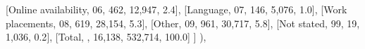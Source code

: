 \documentclass[
  11pt,
  a4paper,
]{article}
\newenvironment{Shaded}{\begin{snugshade}}{\end{snugshade}}
\newcommand{\NormalTok}[1]{\textcolor[rgb]{0.00,0.23,0.31}{#1}}
\newcommand{\StringTok}[1]{\textcolor[rgb]{0.13,0.47,0.30}{#1}}
\begin{document}
\begin{Shaded}
\begin{Highlighting}[]
\NormalTok{                    [}\StringTok{\textquotesingle{}Online availability\textquotesingle{}}\NormalTok{, }\StringTok{\textquotesingle{}06\textquotesingle{}}\NormalTok{, }\StringTok{\textquotesingle{}462\textquotesingle{}}\NormalTok{, }\StringTok{\textquotesingle{}12,947\textquotesingle{}}\NormalTok{, }\StringTok{\textquotesingle{}2.4\textquotesingle{}}\NormalTok{],}
\NormalTok{                    [}\StringTok{\textquotesingle{}Language\textquotesingle{}}\NormalTok{, }\StringTok{\textquotesingle{}07\textquotesingle{}}\NormalTok{, }\StringTok{\textquotesingle{}146\textquotesingle{}}\NormalTok{, }\StringTok{\textquotesingle{}5,076\textquotesingle{}}\NormalTok{, }\StringTok{\textquotesingle{}1.0\textquotesingle{}}\NormalTok{],}
\NormalTok{                    [}\StringTok{\textquotesingle{}Work placements\textquotesingle{}}\NormalTok{, }\StringTok{\textquotesingle{}08\textquotesingle{}}\NormalTok{, }\StringTok{\textquotesingle{}619\textquotesingle{}}\NormalTok{, }\StringTok{\textquotesingle{}28,154\textquotesingle{}}\NormalTok{, }\StringTok{\textquotesingle{}5.3\textquotesingle{}}\NormalTok{],}
\NormalTok{                    [}\StringTok{\textquotesingle{}Other\textquotesingle{}}\NormalTok{, }\StringTok{\textquotesingle{}09\textquotesingle{}}\NormalTok{, }\StringTok{\textquotesingle{}961\textquotesingle{}}\NormalTok{, }\StringTok{\textquotesingle{}30,717\textquotesingle{}}\NormalTok{, }\StringTok{\textquotesingle{}5.8\textquotesingle{}}\NormalTok{],}
\NormalTok{                    [}\StringTok{\textquotesingle{}Not stated\textquotesingle{}}\NormalTok{, }\StringTok{\textquotesingle{}99\textquotesingle{}}\NormalTok{, }\StringTok{\textquotesingle{}19\textquotesingle{}}\NormalTok{, }\StringTok{\textquotesingle{}1,036\textquotesingle{}}\NormalTok{, }\StringTok{\textquotesingle{}0.2\textquotesingle{}}\NormalTok{],}
\NormalTok{                    [}\StringTok{\textquotesingle{}Total\textquotesingle{}}\NormalTok{, }\StringTok{\textquotesingle{}\textquotesingle{}}\NormalTok{, }\StringTok{\textquotesingle{}16,138\textquotesingle{}}\NormalTok{, }\StringTok{\textquotesingle{}532,714\textquotesingle{}}\NormalTok{, }\StringTok{\textquotesingle{}100.0\textquotesingle{}}\NormalTok{]}
\NormalTok{                ]}
\NormalTok{            ),}


\end{Highlighting}
\end{Shaded}
\end{document}
